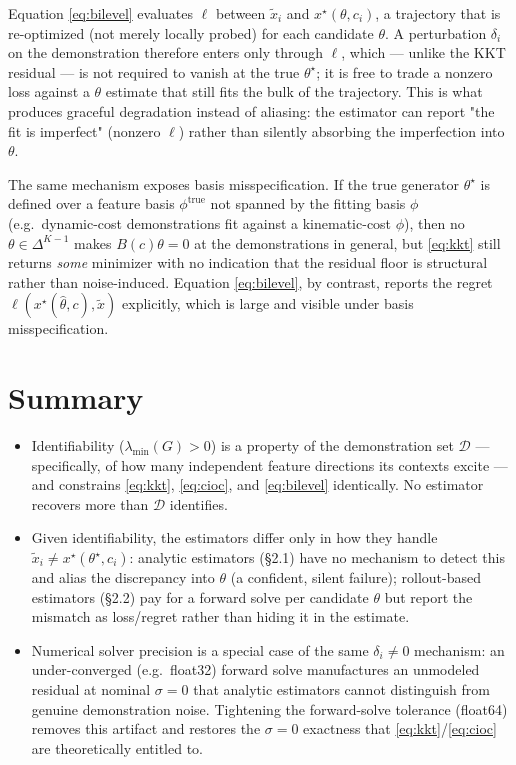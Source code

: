 \documentclass[11pt]{article}
\newcommand{\theovec}{\theta}
\newcommand{\xdemo}{\tilde{x}}
\begin{document}
Equation \eqref{eq:bilevel} evaluates $\ell$ between $\xdemo_i$ and
$x^\star(\theovec, c_i)$, a trajectory that is re-optimized (not merely
locally probed) for each candidate $\theovec$. A perturbation $\delta_i$ on
the demonstration therefore enters only through $\ell$, which — unlike the
KKT residual — is not required to vanish at the true $\theovec^\star$; it is
free to trade a nonzero loss against a $\theovec$ estimate that still fits the
bulk of the trajectory. This is what produces graceful degradation instead of
aliasing: the estimator can report "the fit is imperfect" (nonzero $\ell$)
rather than silently absorbing the imperfection into $\theovec$.

The same mechanism exposes basis misspecification. If the true generator
$\theovec^\star$ is defined over a feature basis $\phi^{\mathrm{true}}$ not
spanned by the fitting basis $\phi$ (e.g.\ dynamic-cost demonstrations fit
against a kinematic-cost $\phi$), then no $\theovec \in \Delta^{K-1}$ makes
$B(c)\theovec = 0$ at the demonstrations in general, but \eqref{eq:kkt} still
returns \emph{some} minimizer with no indication that the residual floor is
structural rather than noise-induced. Equation \eqref{eq:bilevel}, by
contrast, reports the regret $\ell(x^\star(\hat\theovec,c),\xdemo)$
explicitly, which is large and visible under basis misspecification.

\section{Summary}

\begin{itemize}
\item Identifiability ($\lambda_{\min}(G) > 0$) is a property of the
  demonstration set $\mathcal{D}$ — specifically, of how many independent
  feature directions its contexts excite — and constrains
  \eqref{eq:kkt}, \eqref{eq:cioc}, and \eqref{eq:bilevel} identically. No
  estimator recovers more than $\mathcal{D}$ identifies.
\item Given identifiability, the estimators differ only in how they handle
  $\xdemo_i \ne x^\star(\theovec^\star,c_i)$: analytic estimators
  (\S2.1) have no mechanism to detect this and alias the discrepancy into
  $\theovec$ (a confident, silent failure); rollout-based estimators (\S2.2)
  pay for a forward solve per candidate $\theovec$ but report the mismatch as
  loss/regret rather than hiding it in the estimate.
\item Numerical solver precision is a special case of the same
  $\delta_i \ne 0$ mechanism: an under-converged (e.g.\ float32) forward
  solve manufactures an unmodeled residual at nominal $\sigma = 0$ that
  analytic estimators cannot distinguish from genuine demonstration noise.
  Tightening the forward-solve tolerance (float64) removes this artifact and
  restores the $\sigma=0$ exactness that \eqref{eq:kkt}/\eqref{eq:cioc} are
  theoretically entitled to.
\end{itemize}
\end{document}
